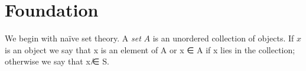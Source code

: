 
\chapter{Foundation}

We begin with na\"ive set theory. A \emph{set} $A$ is an unordered collection of objects. If $x$ is an object we say that x is an element of A or x ∈ A if x lies in the collection; otherwise we say that x ̸∈ S. 


